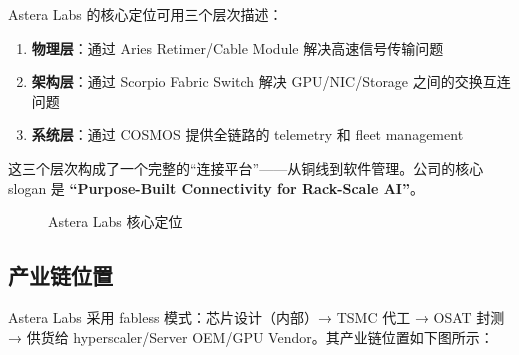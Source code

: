 Astera Labs 的核心定位可用三个层次描述：

\begin{enumerate}
    \item \textbf{物理层}：通过 Aries Retimer/Cable Module 解决高速信号传输问题
    \item \textbf{架构层}：通过 Scorpio Fabric Switch 解决 GPU/NIC/Storage 之间的交换互连问题
    \item \textbf{系统层}：通过 COSMOS 提供全链路的 telemetry 和 fleet management
\end{enumerate}

这三个层次构成了一个完整的``连接平台''——从铜线到软件管理。公司的核心 slogan 是
\textbf{``Purpose-Built Connectivity for Rack-Scale AI''}。

\begin{figure}[htb]
    \centering
    \caption{Astera Labs 核心定位}
    \label{fig:positioning}
\end{figure}

\subsection{产业链位置}

Astera Labs 采用 fabless 模式：芯片设计（内部）→ TSMC 代工 → OSAT 封测 →
供货给 hyperscaler/Server OEM/GPU Vendor。其产业链位置如下图所示：

